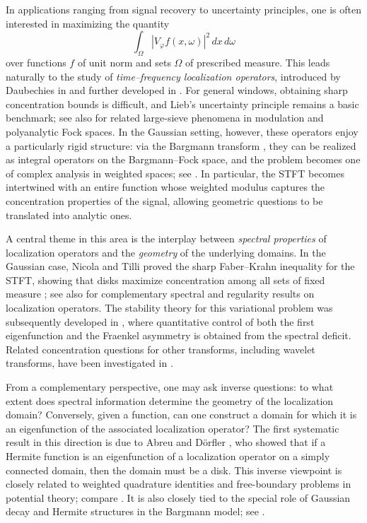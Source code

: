 \documentclass[a4paper,11pt,reqno]{amsart}
\numberwithin{equation}{section}
\theoremstyle{plain} %
\theoremstyle{definition} %
\theoremstyle{remark}
\begin{document}
In applications ranging from signal recovery to uncertainty principles, one is often interested in maximizing the quantity
\[
\int_\Omega |V_\varphi f(x,\omega)|^2\,dx\,d\omega
\]
over functions $f$ of unit norm and sets $\Omega$ of prescribed measure. This leads naturally to the study of \emph{time--frequency localization operators}, introduced by Daubechies in \cite{Daubechies} and further developed in \cite{Daubechies-Paul,Ramanathan-Topiwala-Weyl,Ramanathan-Topiwala-Spectrogram,Cordero-Grochenig,Boggiatto-Cordero-Grochenig,Bayer-Grochenig,Kisil-CrossToeplitz,Nicola-Tilli-2,Ramos-time-frequency}. For general windows, obtaining sharp concentration bounds is difficult, and Lieb's uncertainty principle \cite{Lieb} remains a basic benchmark; see also \cite{abreu2021donoho} for related large-sieve phenomena in modulation and polyanalytic Fock spaces. In the Gaussian setting, however, these operators enjoy a particularly rigid structure: via the Bargmann transform \cite{Bargmann}, they can be realized as integral operators on the Bargmann--Fock space, and the problem becomes one of complex analysis in weighted spaces; see \cite{Berezin,Berger-Coburn-Symbol,Berger-Coburn,Berger-Coburn-Heat,Zhu,Grochenig,Folland}. In particular, the STFT becomes intertwined with an entire function whose weighted modulus captures the concentration properties of the signal, allowing geometric questions to be translated into analytic ones.

A central theme in this area is the interplay between \emph{spectral properties} of localization operators and the \emph{geometry} of the underlying domains. In the Gaussian case, Nicola and Tilli proved the sharp Faber--Krahn inequality for the STFT, showing that disks maximize concentration among all sets of fixed measure \cite{Nicola-Tilli}; see also \cite{Nicola-Tilli-2,Bastianoni-Cordero-Nicola,Bastianoni-Teofanov} for complementary spectral and regularity results on localization operators. The stability theory for this variational problem was subsequently developed in \cite{Gomez-Guerra-Ramos-Tilli}, where quantitative control of both the first eigenfunction and the Fraenkel asymmetry is obtained from the spectral deficit. Related concentration questions for other transforms, including wavelet transforms, have been investigated in \cite{Ramos-Tilli}.

From a complementary perspective, one may ask inverse questions: to what extent does spectral information determine the geometry of the localization domain? Conversely, given a function, can one construct a domain for which it is an eigenfunction of the associated localization operator? The first systematic result in this direction is due to Abreu and D\"orfler \cite{Abreu-Doerfler}, who showed that if a Hermite function is an eigenfunction of a localization operator on a simply connected domain, then the domain must be a disk. This inverse viewpoint is closely related to weighted quadrature identities and free-boundary problems in potential theory; compare \cite{Aharonov-Schiffer-Zalcman,Cherednichenko,Gustafsson,Gustafsson-Shahgholian,Shahgholian,Karp}. It is also closely tied to the special role of Gaussian decay and Hermite structures in the Bargmann model; see \cite{Kulikov-Oliveira-Ramos,Goncalves-Oliveira-Steinerberger,Thangavelu}.
\end{document}
